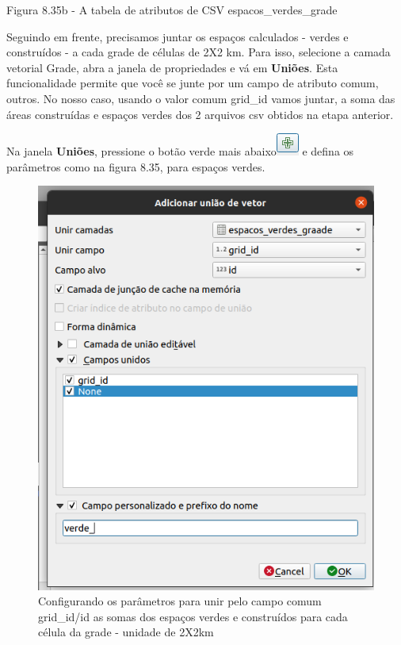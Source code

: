 \documentclass[
  portuguese,
]{krantz}
\begin{document}
Figura 8.35b - A tabela de atributos de CSV espacos\_verdes\_grade

Seguindo em frente, precisamos juntar os espaços calculados - verdes e construídos - a cada grade de células de 2X2 km. Para isso, selecione a camada vetorial Grade, abra a janela de propriedades e vá em \textbf{Uniões}. Esta funcionalidade permite que você se junte por um campo de atributo comum, outros. No nosso caso, usando o valor comum grid\_id vamos juntar, a soma das áreas construídas e espaços verdes dos 2 arquivos csv obtidos na etapa anterior.

Na janela \textbf{Uniões}, pressione o botão verde mais abaixo\includegraphics{media/modulo8/add_join_btn.png} e defina os parâmetros como na figura 8.35, para espaços verdes.

\begin{figure}
\centering
\includegraphics{media/modulo8/fig835_c.png}
\caption{Configurando os parâmetros para unir pelo campo comum grid\_id/id as somas dos espaços verdes e construídos para cada célula da grade - unidade de 2X2km}
\end{figure}
\end{document}
